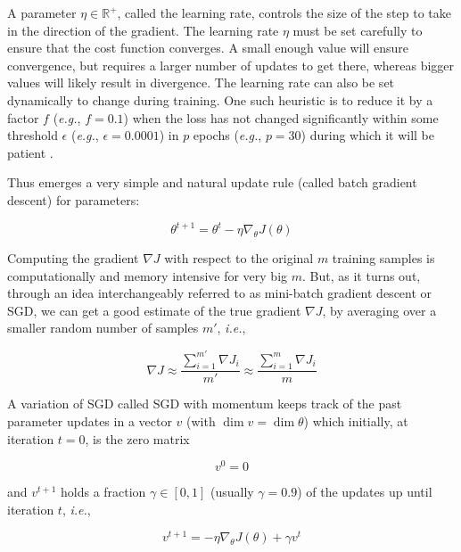 A parameter $\eta \in \mathbb{{R}^{+}}$, called the learning rate, controls the size of the step to take in the direction of the gradient. The learning rate $\eta$ must be set carefully to ensure that the cost function converges. A small enough value will ensure convergence, but requires a larger number of updates to get there, whereas bigger values will likely result in divergence. The learning rate can also be set dynamically to change during training. One such heuristic is to reduce it by a factor $f$ (\textit{e.g.}, $f=0.1$) when the loss has not changed significantly within some threshold $\epsilon$ (\textit{e.g.}, $\epsilon=0.0001$) in $p$ epochs (\textit{e.g.}, $p=30$) during which it will be patient \cite{learningrateschedules}.

Thus emerges a very simple and natural update rule (called batch gradient descent) for parameters:

\begin{equation}
\theta^{t+1} = \theta^t - \eta \nabla_{\theta} J(\theta)
\end{equation}

Computing the gradient $\nabla J$ with respect to the original $m$ training samples is computationally and memory intensive for very big $m$. But, as it turns out, through an idea interchangeably referred to as mini-batch gradient descent or \ac{SGD}, we can get a good estimate of the true gradient $\nabla J$, by averaging over a smaller random number of samples $m'$, \textit{i.e.},

\begin{equation}
\nabla J \approx \frac{\sum_{i=1}^{m'} \nabla J_i}{m'} \approx \frac{\sum_{i=1}^m \nabla J_{i}}{m}
\end{equation}

A variation of \ac{SGD} called \ac{SGD} with momentum \cite{ruder2016} keeps track of the past parameter updates in a vector $v$ (with $\dim v = \dim \theta$) which initially, at iteration $t = 0$, is the zero matrix

\begin{equation}
v^0 = 0
\end{equation}

and $v^{t+1}$ holds a fraction $\gamma \in [0,1]$ (usually $\gamma = 0.9$) of the updates up until iteration $t$, \textit{i.e.},

\begin{equation}
v^{t+1} = -\eta \nabla_{\theta} J(\theta) + \gamma v^{t}
\end{equation}

